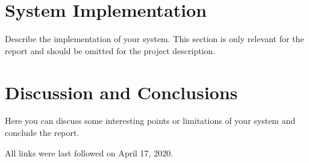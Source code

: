 \documentclass[runningheads]{llncs}
\begin{document}
\section{System Implementation}
Describe the implementation of your system. This section is only relevant for the report and should be omitted for the project description. 

\section{Discussion and Conclusions}
Here you can discuss some interesting points or limitations of your system and conclude the report.

%
%



All links were last followed on April 17, 2020.
\end{document}
